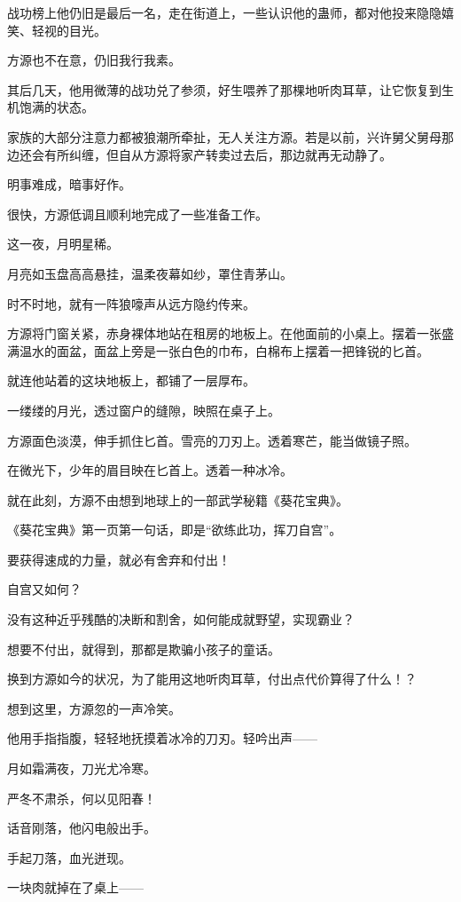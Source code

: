\begin{this_body}
战功榜上他仍旧是最后一名，走在街道上，一些认识他的蛊师，都对他投来隐隐嬉笑、轻视的目光。

方源也不在意，仍旧我行我素。

其后几天，他用微薄的战功兑了参须，好生喂养了那棵地听肉耳草，让它恢复到生机饱满的状态。

家族的大部分注意力都被狼潮所牵扯，无人关注方源。若是以前，兴许舅父舅母那边还会有所纠缠，但自从方源将家产转卖过去后，那边就再无动静了。

明事难成，暗事好作。

很快，方源低调且顺利地完成了一些准备工作。

这一夜，月明星稀。

月亮如玉盘高高悬挂，温柔夜幕如纱，罩住青茅山。

时不时地，就有一阵狼嚎声从远方隐约传来。

方源将门窗关紧，赤身裸体地站在租房的地板上。在他面前的小桌上。摆着一张盛满温水的面盆，面盆上旁是一张白色的巾布，白棉布上摆着一把锋锐的匕首。

就连他站着的这块地板上，都铺了一层厚布。

一缕缕的月光，透过窗户的缝隙，映照在桌子上。

方源面色淡漠，伸手抓住匕首。雪亮的刀刃上。透着寒芒，能当做镜子照。

在微光下，少年的眉目映在匕首上。透着一种冰冷。

就在此刻，方源不由想到地球上的一部武学秘籍《葵花宝典》。

《葵花宝典》第一页第一句话，即是“欲练此功，挥刀自宫”。

要获得速成的力量，就必有舍弃和付出！

自宫又如何？

没有这种近乎残酷的决断和割舍，如何能成就野望，实现霸业？

想要不付出，就得到，那都是欺骗小孩子的童话。

换到方源如今的状况，为了能用这地听肉耳草，付出点代价算得了什么！？

想到这里，方源忽的一声冷笑。

他用手指指腹，轻轻地抚摸着冰冷的刀刃。轻吟出声——

月如霜满夜，刀光尤冷寒。

严冬不肃杀，何以见阳春！

话音刚落，他闪电般出手。

手起刀落，血光迸现。

一块肉就掉在了桌上——


\end{this_body}
